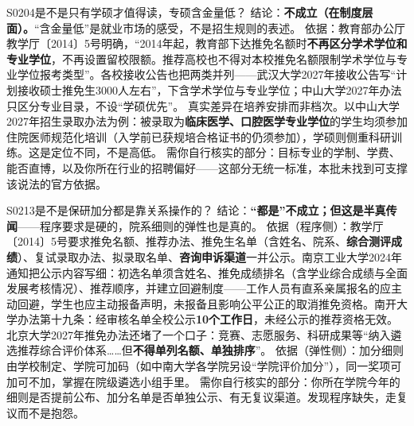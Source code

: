 \begin{qa}{S0204}{是不是只有学硕才值得读，专硕含金量低？}
结论：\textbf{不成立（在制度层面）。}“含金量低”是就业市场的感受，不是招生规则的表述。
依据：教育部办公厅教学厅〔2014〕5号明确，“2014年起，教育部下达推免名额时\textbf{不再区分学术学位和专业学位}，不再设置留校限额。推荐高校也不得对本校推免名额限制学术学位与专业学位报考类型”。各校接收公告也把两类并列——武汉大学2027年接收公告写“计划接收硕士推免生3000人左右”，下含学术学位与专业学位；中山大学2027年办法只区分专业目录，不设“学硕优先”。
真实差异在培养安排而非档次。以中山大学2027年招生录取办法为例：被录取为\textbf{临床医学、口腔医学专业学位}的学生均须参加住院医师规范化培训（入学前已获规培合格证书的仍须参加），学硕则侧重科研训练。这是定位不同，不是高低。
需你自行核实的部分：目标专业的学制、学费、能否直博，以及你所在行业的招聘偏好——这部分无统一标准，本批未找到可支撑该说法的官方依据。
\end{qa}

\begin{qa}{S0213}{是不是保研加分都是靠关系操作的？}
结论：\textbf{“都是”不成立；但这是半真传闻}——程序要求是硬的，院系细则的弹性也是真的。
依据（程序侧）：教学厅〔2014〕5号要求推免名额、推荐办法、推免生名单（含姓名、院系、\textbf{综合测评成绩}）、复试录取办法、拟录取名单、\textbf{咨询申诉渠道}一并公示。南京工业大学2024年通知把公示内容写细：初选名单须含姓名、推免成绩排名（含学业综合成绩与全面发展考核情况）、推荐顺序，并建立回避制度——工作人员有直系亲属报名的应主动回避，学生也应主动报备声明，未报备且影响公平公正的取消推免资格。南开大学办法第十九条：经审核名单全校公示\textbf{10个工作日}，未经公示的推荐资格无效。北京大学2027年推免办法还堵了一个口子：竞赛、志愿服务、科研成果等“纳入遴选推荐综合评价体系……但\textbf{不得单列名额、单独排序}”。
依据（弹性侧）：加分细则由学校制定、学院可加码（如中南大学各学院另设“学院评价加分”），同一奖项可加可不加，掌握在院级遴选小组手里。
需你自行核实的部分：你所在学院今年的细则是否提前公布、加分名单是否单独公示、有无复议渠道。发现程序缺失，走复议而不是抱怨。
\end{qa}

